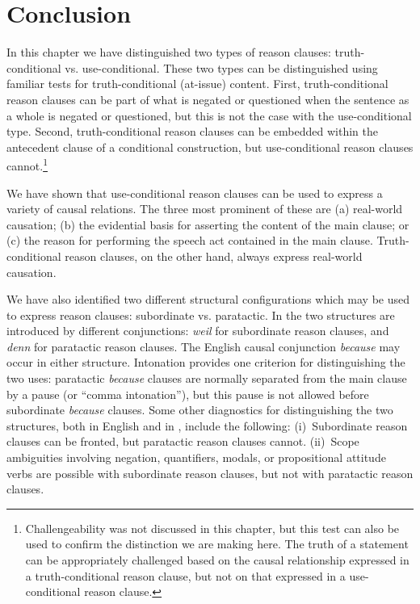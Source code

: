 \section{Conclusion}\label{sec:18.6}\largerpage[2]

In this chapter we have distinguished two types of reason clauses: truth-con\-di\-tion\-al vs. use-conditional. These two types can be distinguished using familiar tests for truth-conditional (at-issue) content. First, truth-conditional reason clauses can be part of what is negated or questioned when the sentence as a whole is negated or questioned, but this is not the case with the use-conditional type. Second, truth-conditional reason clauses can be embedded within the antecedent clause of a conditional construction, but use-conditional reason clauses cannot.\footnote{Challengeability  was not discussed in this chapter, but this test can also be used to confirm the distinction we are making here. The truth of a statement can be appropriately challenged based on the causal relationship expressed in a truth-conditional reason clause, but not on that expressed in a use-conditional reason clause.}


We have shown that use-conditional reason clauses can be used to express a variety of causal relations. The three most prominent of these are (a) real-world causation; (b) the evidential basis for asserting the content of the main clause; or (c) the reason for performing the speech act contained in the main clause. Truth-conditional reason clauses, on the other hand, always express real-world causation.  


We have also identified two different structural configurations which may be used to express reason clauses: subordinate vs. paratactic. In  the two structures are introduced by different conjunctions: \textit{weil} for subordinate reason clauses, and \textit{denn} for paratactic reason clauses. The English causal conjunction \textit{because} may occur in either structure. Intonation provides one criterion for distinguishing the two uses: paratactic \textit{because} clauses are normally separated from the main clause by a pause (or “comma intonation”), but this pause is not allowed before subordinate \textit{because} clauses. Some other diagnostics for distinguishing the two structures, both in English and in , include the following: (i)~Subordinate reason clauses can be fronted, but paratactic reason clauses cannot. (ii)~Scope ambiguities involving negation, quantifiers, modals, or propositional attitude verbs are possible with subordinate reason clauses, but not with paratactic reason clauses.


